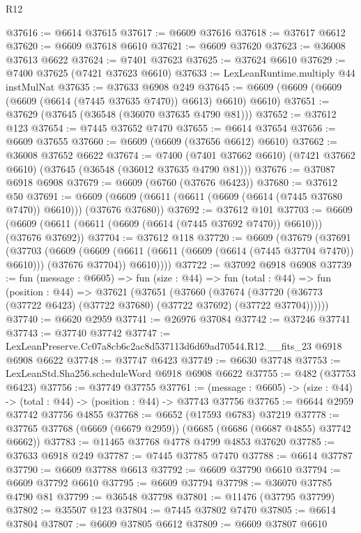 \begin{lexlean}{R12}
\begin{coremodule}
@37616 := @6614 @37615
@37617 := @6609 @37616
@37618 := @37617 @6612
@37620 := @6609 @37618 @6610
@37621 := @6609 @37620
@37623 := @36008 @37613 @6622
@37624 := @7401 @37623
@37625 := @37624 @6610
@37629 := @7400 @37625 (@7421 @37623 @6610)
@37633 := LexLeanRuntime.multiply @44 instMulNat
@37635 := @37633 @6908 @249
@37645 := @6609 (@6609 (@6609 (@6609 (@6614 (@7445 @37635 @7470)) @6613) @6610) @6610)
@37651 := @37629 (@37645 (@36548 (@36070 @37635 @4790 @81)))
@37652 := @37612 @123
@37654 := @7445 @37652 @7470
@37655 := @6614 @37654
@37656 := @6609 @37655
@37660 := @6609 (@6609 (@37656 @6612) @6610)
@37662 := @36008 @37652 @6622
@37674 := @7400
    (@7401 @37662 @6610)
    (@7421 @37662 @6610)
    (@37645 (@36548 (@36012 @37635 @4790 @81)))
@37676 := @37087 @6918 @6908
@37679 := @6609 (@6760 (@37676 @6423))
@37680 := @37612 @50
@37691 := @6609 (@6609 (@6611 (@6611 (@6609 (@6614 (@7445 @37680 @7470)) @6610))) (@37676 @37680))
@37692 := @37612 @101
@37703 := @6609 (@6609 (@6611 (@6611 (@6609 (@6614 (@7445 @37692 @7470)) @6610))) (@37676 @37692))
@37704 := @37612 @118
@37720 := @6609
    (@37679
      (@37691
        (@37703
          (@6609
            (@6609 (@6611 (@6611 (@6609 (@6614 (@7445 @37704 @7470)) @6610))) (@37676 @37704))
            @6610))))
@37722 := @37092 @6918 @6908
@37739 := fun (message : @6605) =>
  fun (size : @44) =>
  fun (total : @44) =>
  fun (position : @44) =>
  @37621
    (@37651
      (@37660
        (@37674 (@37720 (@36773 (@37722 @6423) (@37722 @37680) (@37722 @37692) (@37722 @37704))))))
@37740 := @6620 @2959
@37741 := @26976 @37084
@37742 := @37246 @37741
@37743 := @37740 @37742
@37747 := LexLeanPreserve.Cc07a8cb6c2ac8d537113d6d69ad70544.R12.__fits_23 @6918 @6908 @6622
@37748 := @37747 @6423
@37749 := @6630 @37748
@37753 := LexLeanStd.Sha256.scheduleWord @6918 @6908 @6622
@37755 := @482 (@37753 @6423)
@37756 := @37749 @37755
@37761 := (message : @6605) -> (size : @44) -> (total : @44) -> (position : @44) -> @37743 @37756
@37765 := @6644 @2959 @37742 @37756 @4855
@37768 := @6652 (@17593 @6783) @37219
@37778 := @37765 @37768 (@6669 (@6679 @2959)) (@6685 (@6686 (@6687 @4855) @37742 @6662))
@37783 := @11465 @37768 @4778 @4799 @4853 @37620
@37785 := @37633 @6918 @249
@37787 := @7445 @37785 @7470
@37788 := @6614 @37787
@37790 := @6609 @37788 @6613
@37792 := @6609 @37790 @6610
@37794 := @6609 @37792 @6610
@37795 := @6609 @37794
@37798 := @36070 @37785 @4790 @81
@37799 := @36548 @37798
@37801 := @11476 (@37795 @37799)
@37802 := @35507 @123
@37804 := @7445 @37802 @7470
@37805 := @6614 @37804
@37807 := @6609 @37805 @6612
@37809 := @6609 @37807 @6610

\end{coremodule}
\end{lexlean}
